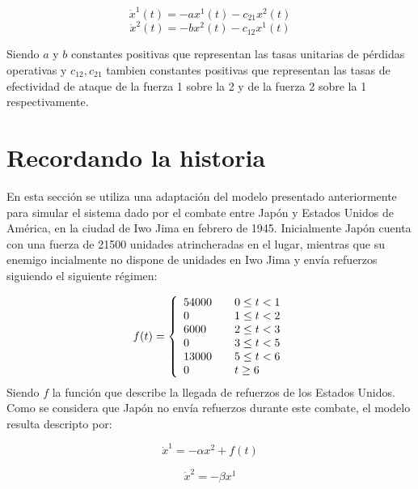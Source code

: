 \documentclass{sig-alternate}
\begin{document}
\begin{equation}
\dot{x}^1(t) = -ax^1(t) - c_{21} x^2(t)\end{equation}
\begin{equation}
\dot{x}^2(t) = -bx^2(t) - c_{12} x^1(t)\end{equation}

Siendo $a$ y $b$ constantes positivas que representan las tasas unitarias de pérdidas operativas y $c_{12}, c_{21}$ tambien constantes positivas
que representan las tasas de efectividad de ataque de la fuerza 1 sobre la 2 y de la fuerza 2 sobre la 1 respectivamente.

\section{Recordando la historia}

En esta sección se utiliza una adaptación del modelo presentado anteriormente para simular el sistema dado por el combate entre Japón y 
Estados Unidos de América, en la ciudad de Iwo Jima en febrero de 1945. Inicialmente Japón cuenta con una fuerza de 21500 unidades 
atrincheradas en el lugar, mientras que su enemigo incialmente no dispone de unidades en Iwo Jima y envía refuerzos siguiendo el siguiente 
régimen:

\begin{equation}
f(t) = \left\{ 
    \begin{array}{l l}
    54000 & \quad 0 \leq t < 1 \\
    0 & \quad 1 \leq t < 2\\
    6000 & \quad 2 \leq t < 3\\
    0 & \quad 3 \leq t < 5\\
    13000 & \quad 5 \leq t < 6\\
    0 & \quad t \geq 6\\
    \end{array} \right.
\end{equation}
Siendo $f$ la función que describe la llegada de refuerzos de los Estados Unidos. Como se considera que Japón no envía refuerzos durante este
combate, el modelo resulta descripto por:

\begin{equation}
 \dot{x}^1 = -\alpha x^2 + f(t)
\end{equation}

\begin{equation}
\dot{x}^2 = -\beta x^1
\end{equation}
\end{document}
